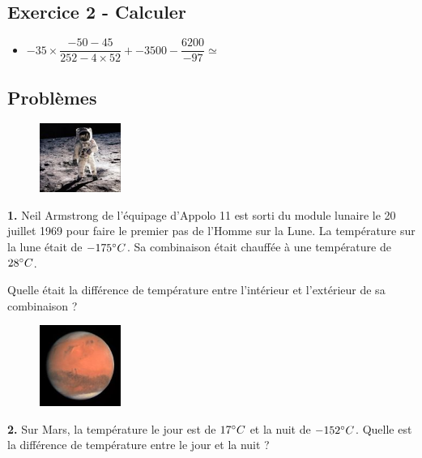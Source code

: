 \subsection*{Exercice 2 - Calculer}

\begin{itemize}[label={$\bullet$}]
        \item $-35 \times \dfrac{-50 - 45}{252 - 4 \times 52} + -3500 - \dfrac{6200}{-97} \simeq $ \dotfill
\end{itemize}


\subsection*{Problèmes}

\begin{minipage}[t]{0.25\textwidth}
  \begin{figure}[H]
    \centering
    \includegraphics[width=100px]{4x2-nombres-relatifs/ex1.jpg}
  \end{figure}
\end{minipage}
\begin{minipage}[t]{0.75\textwidth}
\textbf{1.} Neil Armstrong de l'équipage d'Appolo 11 est sorti du module lunaire le 20 juillet 1969 pour faire le premier pas de l'Homme sur la Lune. La température sur la lune était de $-175 \degree C$. Sa combinaison était chauffée à une température de $28 \degree C$. 

Quelle était la différence de température entre l'intérieur et l'extérieur de sa combinaison ? \\
\Pointilles[6]
\end{minipage}

\begin{minipage}[t]{0.25\textwidth}
  \begin{figure}[H]
    \centering
    \includegraphics[width=100px]{4x2-nombres-relatifs/ex4.jpg}
  \end{figure}
\end{minipage}
\begin{minipage}[t]{0.75\textwidth}
  \textbf{2.} Sur Mars, la température le jour est de $17\degree C$ et la nuit de $-152\degree C$. Quelle est la différence de température entre le jour et la nuit ?\\
  \Pointilles[6]
\end{minipage}

